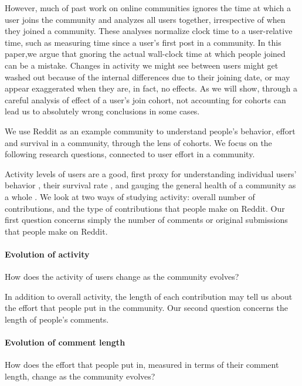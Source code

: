 However, much of past work on online communities ignores the time at which a user joins the community and analyzes all users together, irrespective of when they joined a community. These  analyses normalize clock time to a user-relative time, such as measuring time since a user's first post in a community. In this paper,we argue that gnoring the actual wall-clock time at which people joined can be a mistake. Changes in activity we might see between users might get washed out because of the internal differences due to their joining date, or may appear exaggerated when they are, in fact, no effects. As we will show, through a careful analysis of effect of a user's join cohort, not accounting for cohorts can lead us to absolutely wrong conclusions in some cases. 

We use Reddit as an example community to understand people's behavior, effort and survival in a community, through the lens of cohorts. We focus on the following research questions, connected to user effort in a community. 

Activity levels of users are a good, first proxy for understanding individual users' behavior \cite{}, their survival rate \cite{}, and  gauging the general health of a community as a whole \cite{}. We look at two ways of studying activity: overall number of contributions, and the type of contributions that people make on Reddit. Our first question concerns simply the number of comments or original submissions that people make on Reddit.

\paragraph*{Evolution of activity} How does the activity of users change as the community evolves?

In addition to overall activity, the length of each contribution may tell us about the effort that people put in the community. Our second question concerns the length of people's comments. 

\paragraph*{Evolution of comment length} How does the effort that people put in, measured in terms of their comment length, change as the community evolves?
 

